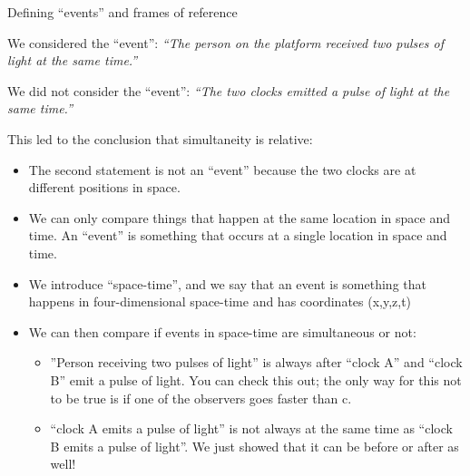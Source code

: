 \documentclass[aspectratio=169,
hyperref={colorlinks,urlcolor=blue}
]{beamer}
\begin{document}
\begin{bulletframe}{Defining ``events'' and frames of reference}
\item We considered the ``event'': \emph{``The person on the platform received two pulses of light at the same time.''}
\item We did not consider the ``event'': \emph{``The two clocks emitted a pulse of light at the same time.''}
\item This led to the conclusion that simultaneity is relative:
\begin{itemize}
\item The second statement is not an ``event'' because the two clocks are at different positions in space. 
\item[$\rightarrow$] We can only compare things that happen at the same location in space and time. An ``event'' is something that occurs at a single location in space and time.
\item[$\rightarrow$] We introduce ``space-time'', and we say that an event is something that happens in four-dimensional space-time and has coordinates (x,y,z,t)
\item[$\rightarrow$] We can then compare if events in space-time are simultaneous or not:
\begin{itemize}
\item[$\rightarrow$] ''Person receiving two pulses of light'' is always after ``clock A'' and  ``clock B'' emit a pulse of light. You can check this out; the only way for this not to be true is if one of the observers goes faster than c.
\item[$\rightarrow$] ``clock A emits a pulse of light'' is not always at the same time as ``clock B emits a pulse of light''. We just showed that it can be before or after as well!
\end{itemize}
\end{itemize}

\end{bulletframe}





\end{document}

